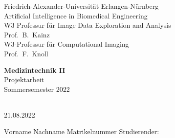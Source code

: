 

\begin{titlepage}

\begin{center}
Friedrich-Alexander-Universit\"at Erlangen-N\"urnberg\\
Artificial Intelligence in Biomedical Engineering\\
W3-Professur für Image Data Exploration and Analysis\\
Prof.\ B.\ Kainz\\
W3-Professur für Computational Imaging\\
Prof.\ F.\ Knoll\\


\vspace*{9em}

{\huge \textbf{\textsf{Medizintechnik II}}}\\[.3em]
{Projektarbeit}\\[.3em]
{Sommersemester 2022}\\

\vspace*{9em}

{\huge \textbf{\textsf{\titel}}}\\[.7em]
{21.08.2022}
\end{center}

\vfill%
\begin{tabbing}
	\hspace*{5cm} \= Vorname Nachname \hspace*{4em} \= Matrikelnummer \kill
	Studierender:\> \erster \> \mnreins \\
\end{tabbing}

\end{titlepage}
